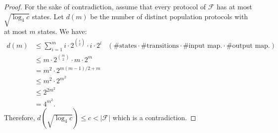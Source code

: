 \begin{proof}
  For the sake of contradiction, assume that every protocol of
  $\mathcal{F}$ has at most $\sqrt{\log_4 c}$ states. Let $d(m)$ be
  the number of distinct population protocols with at most $m$
  states. We have:
  \begin{align*}
    d(m)
    &\leq \sum_{i = 1}^m i \cdot 2^{i \choose 2} \cdot i \cdot 2^i &
    (\text{\# states} \cdot \text{\# transitions} \cdot \text{\# input
      map.} \cdot \text{\# output map.}) \\
    &\leq m \cdot 2^{m \choose 2} \cdot m \cdot 2^m \\
    &= m^2 \cdot 2^{m(m - 1)/2 + m} \\
    &\leq m^2 \cdot 2^{m^2} \\
    &\leq 2^{2m^2} \\
    &= 4^{m^2}.
  \end{align*}
  Therefore, $d(\sqrt{\log_4 c}) \leq c < |\mathcal{F}|$ which is a
  contradiction.
\end{proof}
